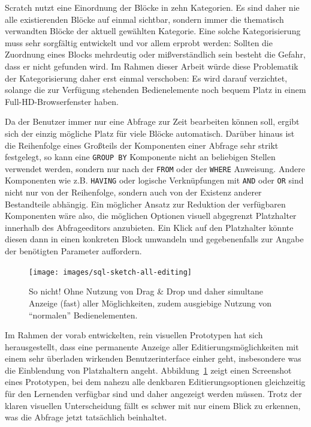 Scratch nutzt eine Einordnung der Blöcke in zehn Kategorien. Es sind daher nie alle existierenden Blöcke auf einmal sichtbar, sondern immer die thematisch verwandten Blöcke der aktuell gewählten Kategorie. Eine solche Kategorisierung muss sehr sorgfältig entwickelt und vor allem erprobt werden: Sollten die Zuordnung eines Blocks mehrdeutig oder mißverständlich sein besteht die Gefahr, dass er nicht gefunden wird. Im Rahmen dieser Arbeit würde diese Problematik der Kategorisierung daher erst einmal verschoben: Es wird darauf verzichtet, solange die zur Verfügung stehenden Bedienelemente noch bequem Platz in einem Full-HD-Browserfenster haben.

Da der Benutzer immer nur eine Abfrage zur Zeit bearbeiten können soll, ergibt sich der einzig mögliche Platz für viele Blöcke automatisch. Darüber hinaus ist die Reihenfolge eines Großteils der Komponenten einer Abfrage sehr strikt festgelegt, so kann eine \texttt{GROUP BY} Komponente nicht an beliebigen Stellen verwendet werden, sondern nur nach der \texttt{FROM} oder der \texttt{WHERE} Anweisung. Andere Komponenten wie z.B. \texttt{HAVING} oder logische Verknüpfungen mit \texttt{AND} oder \texttt{OR} sind nicht nur von der Reihenfolge, sondern auch von der Existenz anderer Bestandteile abhängig. Ein möglicher Ansatz zur Reduktion der verfügbaren Komponenten wäre also, die möglichen Optionen visuell abgegrenzt Platzhalter innerhalb des Abfrageeditors anzubieten. Ein Klick auf den Platzhalter könnte diesen dann in einen konkreten Block umwandeln und gegebenenfalls zur Angabe der benötigten Parameter auffordern.

\begin{figure}[p]
  \texttt{[image: images/sql-sketch-all-editing]}
  \caption{So nicht! Ohne Nutzung von Drag \& Drop und daher simultane Anzeige (fast) aller Möglichkeiten, zudem ausgiebige Nutzung von "`normalen"' Bedienelementen.}
  \label{fig:screen-sql-editor-all-editing}
\end{figure}

Im Rahmen der vorab entwickelten, rein visuellen Prototypen hat sich herausgestellt, dass eine permanente Anzeige aller Editierungsmöglichkeiten mit einem sehr überladen wirkenden Benutzerinterface einher geht, insbesondere was die Einblendung von Platzhaltern angeht. Abbildung~\ref{fig:screen-sql-editor-all-editing} zeigt einen Screenshot eines Prototypen, bei dem nahezu alle denkbaren Editierungsoptionen gleichzeitig für den Lernenden verfügbar sind und daher angezeigt werden müssen. Trotz der klaren visuellen Unterscheidung fällt es schwer mit nur einem Blick zu erkennen, was die Abfrage jetzt tatsächlich beinhaltet.

